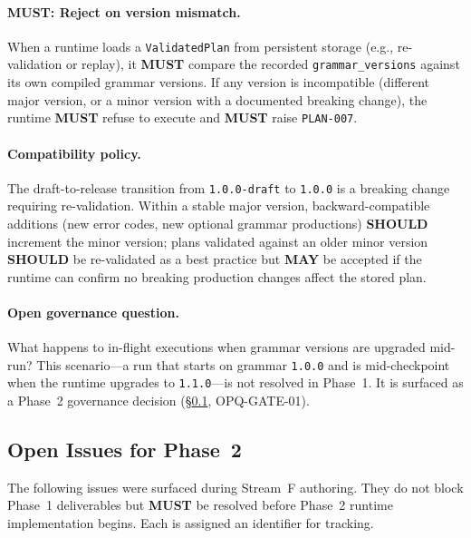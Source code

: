 \paragraph{MUST: Reject on version mismatch.}
When a runtime loads a \texttt{ValidatedPlan} from persistent storage (e.g.,
re-validation or replay), it \textbf{MUST} compare the recorded
\texttt{grammar\_versions} against its own compiled grammar versions.  If any
version is incompatible (different major version, or a minor version with a
documented breaking change), the runtime \textbf{MUST} refuse to execute and
\textbf{MUST} raise \texttt{PLAN-007}.

\paragraph{Compatibility policy.}
The draft-to-release transition from \texttt{1.0.0-draft} to
\texttt{1.0.0} is a breaking change requiring re-validation.  Within a stable
major version, backward-compatible additions (new error codes, new optional
grammar productions) \textbf{SHOULD} increment the minor version; plans
validated against an older minor version \textbf{SHOULD} be re-validated as a
best practice but \textbf{MAY} be accepted if the runtime can confirm no
breaking production changes affect the stored plan.

\paragraph{Open governance question.}
What happens to in-flight executions when grammar versions are upgraded
mid-run?  This scenario---a run that starts on grammar \texttt{1.0.0}
and is mid-checkpoint when the runtime upgrades to \texttt{1.1.0}---is
not resolved in Phase~1.  It is surfaced as a Phase~2 governance decision
(\S\ref{sec:parse-gate:open-issues}, OPQ-GATE-01).

\subsection{Open Issues for Phase~2}
\label{sec:parse-gate:open-issues}

The following issues were surfaced during Stream~F authoring.  They do not
block Phase~1 deliverables but \textbf{MUST} be resolved before Phase~2
runtime implementation begins.  Each is assigned an identifier for tracking.


